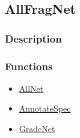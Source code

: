 \subsection{AllFragNet}\label{AllFragNet}
\subsubsection{Description}


\subsubsection{Functions}
\begin{itemize}
\item \hyperref[AllNet]{AllNet}
\item \hyperref[AnnotateSpec]{AnnotateSpec}
\item \hyperref[GradeNet]{GradeNet}
\end{itemize}


